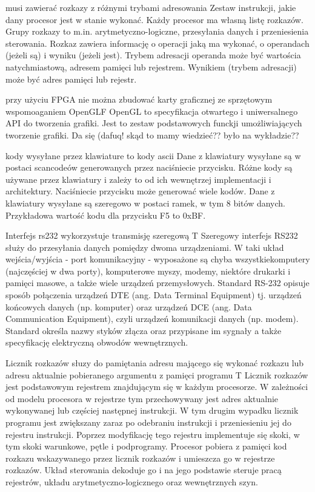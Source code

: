 {musi zawierać rozkazy z różnymi trybami adresowania}{}
{
Zestaw instrukcji, jakie dany procesor jest w stanie wykonać. Każdy procesor ma własną listę rozkazów. Grupy rozkazy to m.in. arytmetyczno-logiczne, przesyłania danych i przeniesienia sterowania. Rozkaz zawiera informację o operacji jaką ma wykonać, o operandach (jeżeli są) i wyniku (jeżeli jest). Trybem adresacji operanda może być wartościa natychmiastową, adresem pamięci lub rejestrem. Wynikiem (trybem adresacji) może być adres pamięci lub rejestr.
}
{}

{przy użyciu FPGA nie można zbudować karty graficznej ze sprzętowym wspomoaganiem OpenGL}{F}
{
OpenGL to specyfikacja otwartego i uniwersalnego API do tworzenia grafiki. Jest to zestaw podstawowych funckji umożliwiających tworzenie grafiki.
}
{Da się \cite{fpga:logi3D} (dafuq! skąd to mamy wiedzieć?? było na wykładzie??}

{kody wysyłane przez klawiature to kody ascii}{}
{
Dane z klawiatury wysyłane są w postaci scancodeów generowanych przez naciśniecie przycisku. Różne kody są używane przez klawiatury i zależy to od ich wewnętrzej implementacji i architektury. Naciśniecie przycisku może generować wiele kodów. Dane z klawiatury wysyłane są szeregowo w postaci ramek, w tym 8 bitów danych. Przykładowa wartość kodu dla przycisku F5 to 0xBF.
}
{}


\label{odp:99}
\answer
{Interfejs rs232}
{wykorzystuje transmisję szeregową}
{T}
{
Szeregowy interfejs RS232 służy do przesyłania danych pomiędzy dwoma urządzeniami. W taki układ wejścia/wyjścia - port komunikacyjny - wyposażone są chyba wszystkiekomputery (najczęściej w dwa porty), komputerowe myszy, modemy, niektóre drukarki i pamięci masowe, a także wiele urządzeń przemysłowych.
}
{
Standard RS-232 opisuje sposób połączenia urządzeń DTE (ang. Data Terminal Equipment) tj. urządzeń końcowych danych (np. komputer) oraz urządzeń DCE (ang. Data Communication Equipment), czyli urządzeń komunikacji danych (np. modem). Standard określa nazwy styków złącza oraz przypisane im sygnały a także specyfikację elektryczną obwodów wewnętrznych.
}

\label{odp:100}
\answer
{Licznik rozkazów}
{słuzy do pamiętania adresu mającego się wykonać rozkazu lub adresu aktualnie pobieranego argumentu z pamięci programu}
{T}
{
Licznik rozkazów jest podstawowym rejestrem znajdującym się w każdym procesorze. W zależności od modelu procesora w rejestrze tym przechowywany jest adres aktualnie wykonywanej lub częściej następnej instrukcji. W tym drugim wypadku licznik programu jest zwiększany zaraz po odebraniu instrukcji i przeniesieniu jej do rejestru instrukcji. Poprzez modyfikację tego rejestru implementuje się skoki, w tym skoki warunkowe, pętle i podprogramy.
}
{
Procesor pobiera z pamięci kod rozkazu wskazywanego przez licznik rozkazów i umieszcza go w rejestrze rozkazów. Układ sterowania dekoduje go i na jego podstawie steruje pracą rejestrów, układu arytmetyczno-logicznego oraz wewnętrznych szyn.
}


